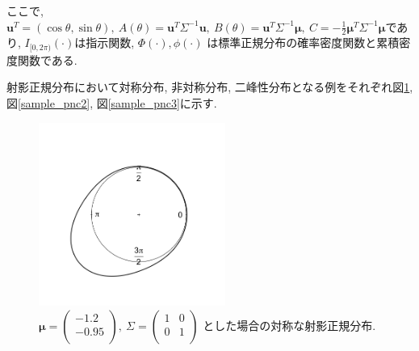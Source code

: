 \documentclass[a4paper,11pt]{jarticle}
\begin{document}
\noindent
ここで, $\bm u^T = (\cos\theta,\sin\theta), \ A(\theta) = \bm u^T\Sigma^{-1}\bm u, \ B(\theta) = \bm u^T \Sigma^{-1} \bm \mu, \ C = -\frac{1}{2} \bm \mu^T \Sigma^{-1} \bm \mu$であり, $I_{[0,2\pi)} (\cdot)$は指示関数, $\Phi(\cdot), \phi(\cdot)$ は標準正規分布の確率密度関数と累積密度関数である.

射影正規分布において対称分布, 非対称分布, 二峰性分布となる例をそれぞれ図\ref{sample_pnc1}, 図\ref{sample_pnc2}, 図\ref{sample_pnc3}に示す. 

\begin{figure}[H]
\begin{center}
\includegraphics[clip,height= 60mm]{data/sample_symmetry.png}
\caption[Text excluding the matrix]{
$\bm \mu = \begin{pmatrix} -1.2 \\ -0.95 \\ \end{pmatrix}, \ \Sigma = \begin{pmatrix}  1 & 0 \\ 0 & 1 \\ \end{pmatrix}$
とした場合の対称な射影正規分布.}
\label{sample_pnc1}
\end{center}
\end{figure}
\end{document}
